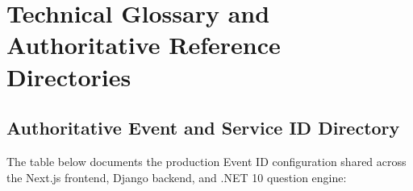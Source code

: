 \documentclass[11pt,a4paper,oneside]{report}
\begin{document}

\newpage


\newpage


\newpage


\newpage


\newpage


\newpage


\newpage


\newpage


\newpage


\newpage


\newpage


\newpage


\newpage


\newpage


\newpage

\chapter{Technical Glossary and Authoritative Reference Directories}

\section{Authoritative Event and Service ID Directory}
The table below documents the production Event ID configuration shared across the Next.js frontend, Django backend, and .NET 10 question engine:
\end{document}
